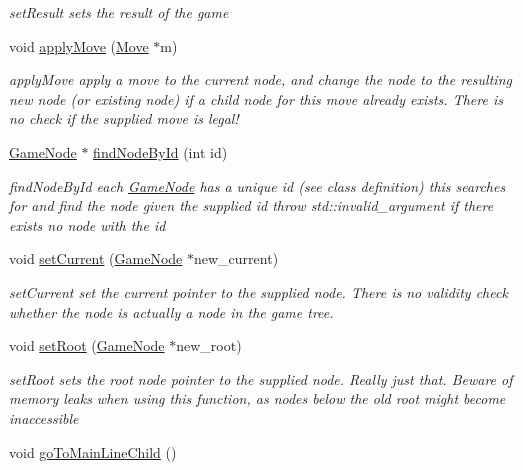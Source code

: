 \begin{DoxyCompactItemize}
\begin{DoxyCompactList}\small\item\em set\-Result sets the result of the game \end{DoxyCompactList}\item 
void \hyperlink{classchess_1_1Game_a5a5346e8f2b6d5063c2e1c8f892a08ed}{apply\-Move} (\hyperlink{classchess_1_1Move}{Move} $\ast$m)
\begin{DoxyCompactList}\small\item\em apply\-Move apply a move to the current node, and change the node to the resulting new node (or existing node) if a child node for this move already exists. There is no check if the supplied move is legal! \end{DoxyCompactList}\item 
\hyperlink{classchess_1_1GameNode}{Game\-Node} $\ast$ \hyperlink{classchess_1_1Game_ac018e45f806510247404ba56feda568c}{find\-Node\-By\-Id} (int id)
\begin{DoxyCompactList}\small\item\em find\-Node\-By\-Id each \hyperlink{classchess_1_1GameNode}{Game\-Node} has a unique id (see class definition) this searches for and find the node given the supplied id throw std\-::invalid\-\_\-argument if there exists no node with the id \end{DoxyCompactList}\item 
void \hyperlink{classchess_1_1Game_a07156dfe4b3dff8991350dcb38c9508e}{set\-Current} (\hyperlink{classchess_1_1GameNode}{Game\-Node} $\ast$new\-\_\-current)
\begin{DoxyCompactList}\small\item\em set\-Current set the current pointer to the supplied node. There is no validity check whether the node is actually a node in the game tree. \end{DoxyCompactList}\item 
void \hyperlink{classchess_1_1Game_af508607bc605b8974c2a393f0b3ecae1}{set\-Root} (\hyperlink{classchess_1_1GameNode}{Game\-Node} $\ast$new\-\_\-root)
\begin{DoxyCompactList}\small\item\em set\-Root sets the root node pointer to the supplied node. Really just that. Beware of memory leaks when using this function, as nodes below the old root might become inaccessible \end{DoxyCompactList}\item 
\hypertarget{classchess_1_1Game_a254acf6e5423d9f9332f6f43f0455cb7}{void \hyperlink{classchess_1_1Game_a254acf6e5423d9f9332f6f43f0455cb7}{go\-To\-Main\-Line\-Child} ()}\label{classchess_1_1Game_a254acf6e5423d9f9332f6f43f0455cb7}


\end{DoxyCompactItemize}
